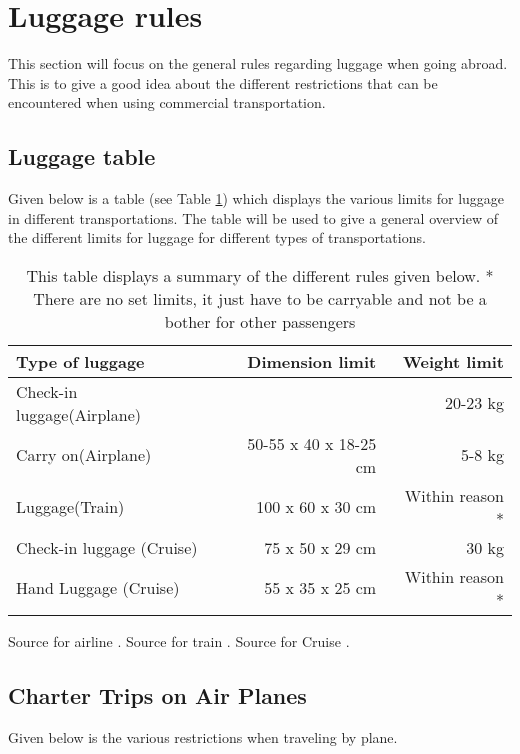 \section{Luggage rules}
\label{sec:LugRules}
This section will focus on the general rules regarding luggage when going abroad. This is to give a good idea about the different restrictions that can be encountered when using commercial transportation.
\subsection{Luggage table}
Given below is a table (see Table \ref{tab:Lug}) which displays the various limits for luggage in different transportations. The table will be used to give a general overview of the different limits for luggage for different types of transportations.
\begin{table}[H]
\begin{tabular}{| l | r | r |}
\hline
Type of luggage &  Dimension limit & Weight limit \\ \hline
Check-in luggage(Airplane) & & 20-23 kg \\ \hline
Carry on(Airplane) & 50-55 x 40 x 18-25 cm & 5-8 kg \\ \hline
Luggage(Train) & 100 x 60 x 30 cm & Within reason *\\ \hline
Check-in luggage (Cruise) & 75 x 50 x 29 cm & 30 kg \\ \hline
Hand Luggage (Cruise) & 55 x 35 x 25 cm & Within reason *\\ \hline
\end{tabular}
\caption{This table displays a summary of the different rules given below.\newline
* There are no set limits, it just have to be carryable and not be a bother for other passengers}\newline
Source for airline \citep{SAS}. Source for train \citep{idianrules}. Source for Cruise \citep{Cruise}.
\label{tab:Lug}
\end{table}

\subsection{Charter Trips on Air Planes}
Given below is the various restrictions when traveling by plane.

